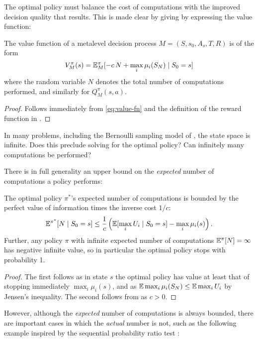 The optimal policy must balance the cost of computations with the improved decision
quality that results.  This is made clear by giving by expressing the value function:

\begin{thm}\label{thm:value-of-computation}
	The value function of a metalevel decision process $M=(S,s_0,A_s,T,R)$ is of the form
	\[
		V^\pi_M(s) = \mathbb{E}^\pi_M[ -c\,N + \max_i \mu_i(S_N) \mathrel{|} S_0=s]
	\]
	where the random variable $N$ denotes the total number of computations performed,
	and similarly for $Q^\pi_M(s,a)$.
\end{thm}

\begin{proof}
	Follows immediately from \eqref{eq:value-fn} and the definition of the
	reward function in .
\end{proof}

In many problems, including the Bernoulli sampling model of ,
the state space is infinite.  Does this preclude solving for the optimal policy?  Can 
infinitely many computations be performed?

There is in full generality an upper bound on the \emph{expected} number of computations
a policy performs:

\begin{thm}\label{thm:bounded-expected-computations}
	The optimal policy $\pi^*$'s expected number of computations is bounded by the 
	perfect value of information \citep{Howard:1966} times the inverse cost $1/c$:
	\[
		\mathbb{E}^{\pi^*}[N\mathrel{|} S_0=s] \le \frac{1}{c} \left(\mathbb{E}[\max_i U_i\mathrel{|} S_0=s] - \max_i \mu_i(s)\right).
	\]
	Further, any policy $\pi$ with infinite expected number of computations 
	$\mathbb{E}^\pi[N]=\infty$ has negative infinite value, so in particular the optimal
	policy stops with probability 1.
\end{thm}

\begin{proof}
	The first follows as in state $s$ the optimal policy has value at least that
	of stopping immediately $\max_i \mu_i(s)$, and as $\mathbb{E} \max_i\mu_i(S_N) \le \mathbb{E} \max_i U_i$ by Jensen's inequality.
	The second follows from  as $c>0$.
\end{proof}

However, although the \emph{expected} number of computations is always bounded,
there are important cases in which the \emph{actual} number is not, such as
the following example inspired by the sequential probability ratio test \citep{Wald+1945}:

